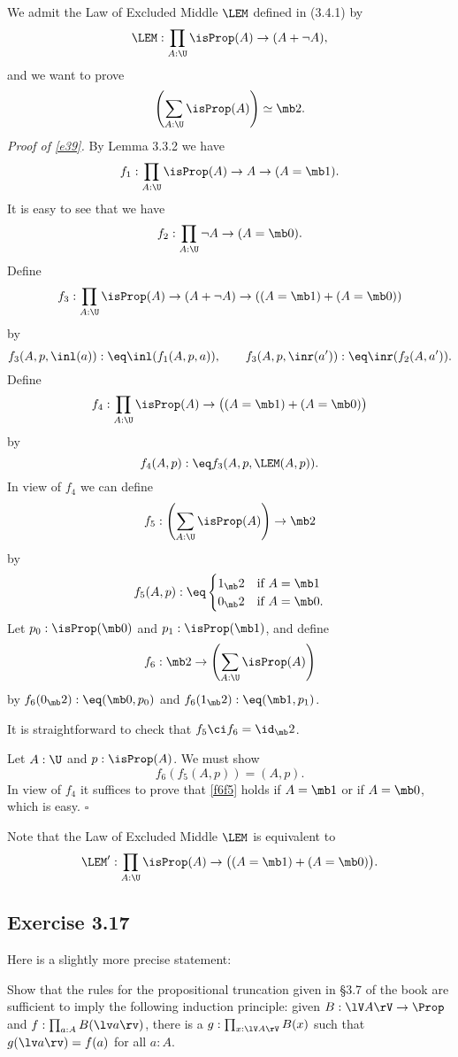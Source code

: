 \documentclass[12pt]{article}
\begin{document}
We admit the Law of Excluded Middle $\LEM$ defined in (3.4.1) by 
$$
\LEM:\prod_{A:\U}\isProp(A)\to(A+\neg A),
$$ 
and we want to prove 
\begin{equation}\label{e39}
\left(\sum_{A:\U}\isProp(A)\right)\simeq\mb2.
\end{equation}
\emph{Proof of \eqref{e39}.} By Lemma 3.3.2 we have 
$$
f_1:\prod_{A:\U}\isProp(A)\to A\to(A=\mb1). 
$$ 
It is easy to see that we have 
$$
f_2:\prod_{A:\U}\neg A\to(A=\mb0). 
$$ 
Define 
$$
f_3:\prod_{A:\U}\isProp(A)\to(A+\neg A)\to((A=\mb1)+(A=\mb0))
$$ 
by 
$$
f_3(A,p,\inl(a)):\eq\inl(f_1(A,p,a)),\qquad f_3(A,p,\inr(a')):\eq\inr(f_2(A,a')).
$$ 
Define 
$$
f_4:\prod_{A:\U}\isProp(A)\to\big((A=\mb1)+(A=\mb0)\big)
$$ 
by 
$$
f_4(A,p):\eq f_3(A,p,\LEM(A,p)).
$$ 
In view of $f_4$ we can define 
$$
f_5:\left(\sum_{A:\U}\isProp(A)\right)\to\mb2
$$ 
by 
$$
f_5(A,p):\eq
\begin{cases}
1_\mb2&\text{if }A=\mb1\\
0_\mb2&\text{if }A=\mb0.
\end{cases}
$$ 
Let $p_0:\isProp(\mb0)$ and $p_1:\isProp(\mb1)$, and define 
$$
f_6:\mb2\to\left(\sum_{A:\U}\isProp(A)\right)
$$ 
by $f_6(0_\mb2):\eq(\mb0,p_0)$ and $f_6(1_\mb2):\eq(\mb1,p_1)$.

It is straightforward to check that $f_5\ci f_6=\id_\mb2$. 

Let $A:\U$ and $p:\isProp(A)$. We must show 
\begin{equation}\label{f6f5}
f_6(f_5(A,p))=(A,p).
\end{equation}
In view of $f_4$ it suffices to prove that \eqref{f6f5} holds if $A=\mb1$ or if $A=\mb0$, which is easy. $\square$ 

Note that the Law of Excluded Middle $\LEM$ is equivalent to 
$$
\LEM':\prod_{A:\U}\isProp(A)\to\big((A=\mb1)+(A=\mb0)\big).
$$ 


\subsection{Exercise 3.17}%

Here is a slightly more precise statement:

Show that the rules for the propositional truncation given in \S3.7 of the book are sufficient to imply the following induction principle: given $B:\lV A\rV\to\Prop$ and $f:\prod_{a:A}B(\lv a\rv)$, there is a $g:\prod_{x:\lV A\rV}B(x)$ such that $g(\lv a\rv)=f(a)$ for all $a:A$.
\end{document}
